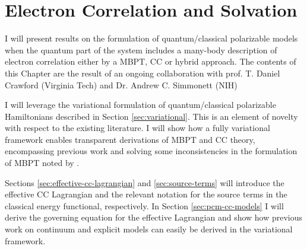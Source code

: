 \chapter{Electron Correlation and Solvation}\label{ch:solvation-correlation}

\begin{epigraphs}
\end{epigraphs}

I will present results on the formulation of quantum/classical
polarizable models when the quantum part of the system includes a
many-body description of electron correlation either by a \gls{MBPT},
\gls{CC} or hybrid approach.
The contents of this Chapter are the result of an ongoing collaboration
with prof. T. Daniel Crawford (Virginia Tech) and Dr. Andrew
C. Simmonett (NIH)

I will leverage the variational formulation of quantum/classical
polarizable Hamiltonians described in Section \ref{sec:variational}.
This is an element of novelty with respect to the existing literature.
I will show how a fully variational framework enables transparent
derivations of \acrshort{MBPT} and \acrshort{CC} theory, encompassing
previous work\autocite{Christiansen1999-tj, Cammi2009-gu,
Caricato2010-hx, Caricato2011-tx, Olivares_del_Valle1991-of,
Aguilar1991-vq, Olivares_del_Valle1991-tq, Olivares_del_Valle1993-xq,
Olivares_del_Valle1993-ra, Surjan1983-oc, Angyan1991-mr, Angyan1993-ay,
Angyan2008-nj, Nielsen2001-yl, Kongsted2003-py, Sneskov2010-dz,
Sneskov2011-jm, Schwabe2012-cf}
and solving some inconsistencies in the formulation of \acrshort{MBPT}
noted by \citeauthor{Angyan1995-co}.\autocite{Angyan1995-co,
Lipparini2009-io}

Sections \ref{sec:effective-cc-lagrangian} and \ref{sec:source-terms}
will introduce the effective \acrshort{CC} Lagrangian and the relevant
notation for the source terms in the classical energy functional,
respectively.
In Section \ref{sec:pcm-cc-models} I will derive the governing equation
for the effective Lagrangian and show how previous work on
continuum\autocite{Christiansen1999-tj, Cammi2009-gu, Caricato2011-tx}
and explicit models\autocite{Kongsted2003-py, Sneskov2011-jm} can easily
be derived in the variational framework.

